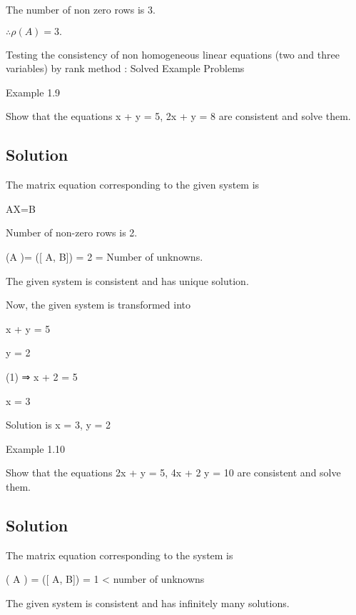 \documentclass[12pt, a4paper]{article}
\begin{document}
The number of non zero rows is 3.

$\therefore \rho (A) =3.$



Testing the consistency of non homogeneous linear equations (two and three variables) by rank method : Solved Example Problems


\newpage 

Example 1.9

Show that the equations x + y = 5, 2x + y = 8 are consistent and solve them.

\bigskip \subsection*{Solution}

The matrix equation corresponding to the given system is



AX=B



Number of non-zero rows is 2.  

\rho (A )= \rho ([ A, B]) = 2 = Number of unknowns.  

The given system is consistent and has unique solution. 

Now, the given system is transformed into



x + y = 5

y = 2

\therefore (1) ⇒ x + 2 = 5

x = 3

Solution is x = 3, y = 2

\newpage 
 

Example 1.10

Show that the equations 2x + y = 5, 4x + 2 y = 10 are consistent and solve them.

\bigskip \subsection*{Solution}

The matrix equation corresponding to the system is



\rho ( A ) = \rho ([ A, B]) = 1 < number of unknowns

\therefore The given system is consistent and has infinitely many solutions.
\end{document}
